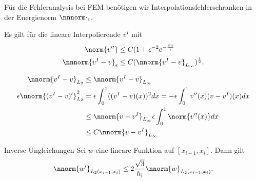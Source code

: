 Für die Fehleranalysis bei FEM benötigen wir Interpolationsfehlerschranken in der Energienorm $\nnnorm \cdot _{\epsilon}$.
\begin{satz}\label{thm:6-14}
  Es gilt für die lineare Interpolierende $v^{I}$ mit
  \begin{align*}
    \norm{v''} &\leq C (1 + \epsilon^{-2} e^{- \frac {\beta x}\epsilon}\\
    \nnnorm{v^{I} - v}_{\epsilon} &\leq C (\nnorm{v^{I} - v}_{L_{\infty}})^{\frac 12}. 
  \end{align*}
\end{satz}
\begin{beweis}
  \begin{align*}
    \nnorm{v^I - v}_{L_{2}} &\leq \nnorm{v^I - v}_{L_{\infty}}\\
    \epsilon\nnorm{(v^I - v)'}_{L_{2}} ^{2} &= \epsilon \int_{0}^{1} ((v^{I} - v) (x))^{2} dx = - \epsilon \int_{0}^{1} v''(x)(v - v^{I}) (x) dx\\
    &\leq \nnorm{v - v^{I}}_{L_{\infty}} \epsilon \int_{0}^{1} \norm{v''(x)} dx\\
    &\leq C\nnorm{v - v^{I}}_{L_{\infty}} 
  \end{align*}
\end{beweis}
\begin{lemma*} Inverse Ungleichungen
  Sei  $w$ eine lineare Funktion auf $[x_{i-1}, x_{i}]$. Dann gilt
  \begin{align*}
    \nnorm{w'}_{L_{2}(x_{i-1}, x_{i})} \leq 2 \frac{\sqrt 3}{h_{i}} \nnorm{w}_{L_{2}(x_{i-1}, x_{i})}. 
  \end{align*}
\end{lemma*}
